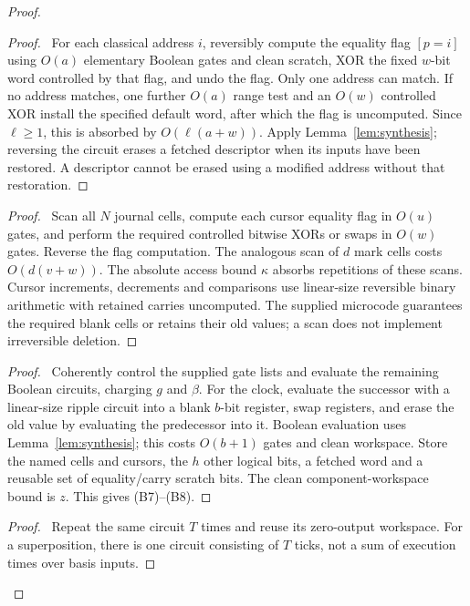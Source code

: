 \begin{proof}
 \begin{proof}\pf\ For each classical address $i$, reversibly compute
 the equality flag $[p=i]$ using $O(a)$ elementary Boolean gates and
 clean scratch, XOR the fixed $w$-bit word controlled by that flag,
 and undo the flag. Only one address can match. If no address matches,
 one further $O(a)$ range test and an $O(w)$ controlled XOR install
 the specified default word, after which the flag is uncomputed.
 Since $\ell\geq1$, this is absorbed by $O(\ell(a+w))$. Apply
 Lemma~\ref{lem:synthesis}; reversing the circuit erases a fetched
 descriptor when its inputs have been restored. A descriptor cannot
 be erased using a modified address without that restoration.\end{proof}
 \begin{proof}\pf\ Scan all $N$ journal cells, compute each cursor
 equality flag in $O(u)$ gates, and perform the required controlled
 bitwise XORs or swaps in $O(w)$ gates. Reverse the flag computation.
 The analogous scan of $d$ mark cells costs $O(d(v+w))$.
 The absolute access bound $\kappa$ absorbs repetitions of these scans.
 Cursor increments, decrements and comparisons use linear-size
 reversible binary arithmetic with retained carries uncomputed.
 The supplied microcode guarantees the required blank cells or retains
 their old values; a scan does not implement irreversible deletion.\end{proof}
 \begin{proof}\pf\ Coherently control the supplied gate lists and
 evaluate the remaining Boolean circuits, charging $g$ and $\beta$.
 For the clock, evaluate the successor with a linear-size ripple
 circuit into a blank $b$-bit register, swap registers, and erase the
 old value by evaluating the predecessor into it. Boolean evaluation
 uses Lemma~\ref{lem:synthesis}; this costs $O(b+1)$ gates and clean
 workspace. Store the named cells and cursors, the $h$ other
 logical bits, a fetched word and a reusable set of equality/carry
 scratch bits. The clean component-workspace bound is $z$.
 This gives (B7)--(B8).\end{proof}
 \qedstep
 \begin{proof}\pf\ Repeat the same circuit $T$ times and reuse its
 zero-output workspace. For a superposition, there is
 one circuit consisting of $T$ ticks, not a sum of execution times over basis
 inputs.\end{proof}
\end{proof}

